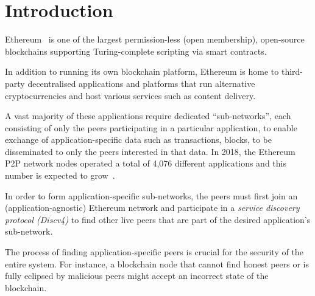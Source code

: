
\section{Introduction}

Ethereum~\cite{buterin2013ethereum}  is one of the largest permission-less (\ie open membership),  open-source  blockchains supporting Turing-complete scripting via smart contracts. 

In addition to running its own blockchain platform, Ethereum is home to third-party decentralised applications and platforms that run alternative cryptocurrencies and host various services such as content delivery. 

A vast majority of these applications require dedicated ``sub-networks'', each consisting of only the peers participating in a particular application, to enable exchange of application-specific data such as transactions, blocks, \etc to be disseminated to only the peers interested in that data. In 2018, the Ethereum P2P network nodes operated a total of 4,076 different applications and this number is expected to grow~\cite{kim2018measuring}. 

In order to form application-specific sub-networks, the peers must first join an (application-agnostic) Ethereum network and participate in a \textit{service discovery protocol (Discv4)} to find other live peers that are part of the desired application's sub-network. 

The process of finding application-specific peers is crucial for the security of the entire system. For instance, a blockchain node that cannot find honest peers or is fully eclipsed by malicious peers might accept an incorrect state of the blockchain. 

